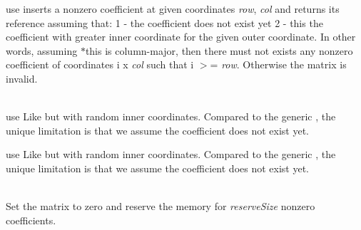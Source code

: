 \begin{DoxyRefList}
\label{deprecated__deprecated000082}%
%
use  inserts a nonzero coefficient at given coordinates {\itshape row}, {\itshape col} and returns its reference assuming that\+: 1 -\/ the coefficient does not exist yet 2 -\/ this the coefficient with greater inner coordinate for the given outer coordinate. In other words, assuming {\ttfamily \texorpdfstring{$\ast$}{*}this} is column-\/major, then there must not exists any nonzero coefficient of coordinates {\ttfamily i} {\ttfamily x} {\itshape col} such that {\ttfamily i} \texorpdfstring{$>$}{>}= {\itshape row}. Otherwise the matrix is invalid. 
\item[Member \doxylink{classEigen_1_1DynamicSparseMatrix_a9cbefc5fea823711bd075419c6d68334}{Eigen\+::Dynamic\+Sparse\+Matrix\texorpdfstring{$<$}{<} \+\_\+\+Scalar, \+\_\+\+Options, \+\_\+\+Storage\+Index \texorpdfstring{$>$}{>}\+::fillrand} (Index row, Index col)]\hfill \\
\label{deprecated__deprecated000041}%
%
use  Like  but with random inner coordinates. Compared to the generic , the unique limitation is that we assume the coefficient does not exist yet. 

\label{deprecated__deprecated000083}%
%
use  Like  but with random inner coordinates. Compared to the generic , the unique limitation is that we assume the coefficient does not exist yet.  
\item[Member \doxylink{classEigen_1_1DynamicSparseMatrix_abade0bf46139d8577aa24ead30c76771}{Eigen\+::Dynamic\+Sparse\+Matrix\texorpdfstring{$<$}{<} \+\_\+\+Scalar, \+\_\+\+Options, \+\_\+\+Storage\+Index \texorpdfstring{$>$}{>}\+::start\+Fill} (Index reserve\+Size=1000)]\hfill \\
\label{deprecated__deprecated000039}%
%
 Set the matrix to zero and reserve the memory for {\itshape reserve\+Size} nonzero coefficients. 


\end{DoxyRefList}
